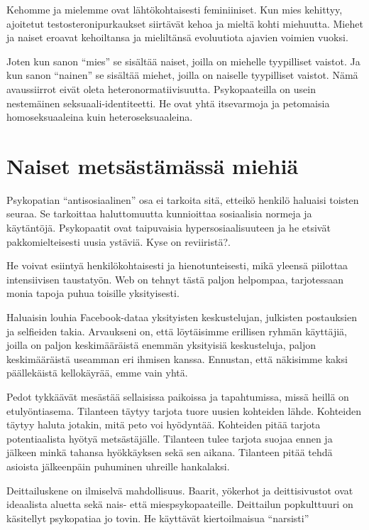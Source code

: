 Kehomme ja mielemme ovat lähtökohtaisesti feminiiniset. Kun mies kehittyy, ajoitetut testosteronipurkaukset siirtävät kehoa ja mieltä kohti miehuutta. Miehet ja naiset eroavat kehoiltansa ja mieliltänsä evoluutiota ajavien voimien vuoksi.

Joten kun sanon ``mies\vmq{,}'' se sisältää naiset, joilla on miehelle tyypilliset vaistot. Ja kun sanon ``nainen\vmq{,}'' se sisältää miehet, joilla on naiselle tyypilliset vaistot. Nämä avaussiirrot eivät oleta heteronormatiivisuutta. Psykopaateilla on usein nestemäinen seksuaali-identiteetti. He ovat yhtä itsevarmoja ja petomaisia homoseksuaaleina kuin heteroseksuaaleina.

\section{Naiset metsästämässä miehiä}

Psykopatian ``antisosiaalinen'' osa ei tarkoita sitä, etteikö henkilö haluaisi toisten seuraa. Se tarkoittaa haluttomuutta kunnioittaa sosiaalisia normeja ja käytäntöjä. Psykopaatit ovat taipuvaisia hypersosiaalisuuteen ja he etsivät pakkomielteisesti uusia ystäviä. Kyse on reviiristä?.

He voivat esiintyä henkilökohtaisesti ja hienotunteisesti, mikä yleensä piilottaa intensiivisen taustatyön. Web on tehnyt tästä paljon helpompaa, tarjotessaan monia tapoja puhua toisille yksityisesti.

Haluaisin louhia Facebook-dataa yksityisten keskustelujan, julkisten postauksien ja selfieiden takia. Arvaukseni on, että löytäisimme erillisen ryhmän käyttäjiä, joilla on paljon keskimääräistä enemmän yksityisiä keskusteluja, paljon keskimääräistä useamman eri ihmisen kanssa. Ennustan, että näkisimme kaksi päällekäistä kellokäyrää, emme vain yhtä.

Pedot tykkäävät mesästää sellaisissa paikoissa ja tapahtumissa, missä heillä on etulyöntiasema. Tilanteen täytyy tarjota tuore uusien kohteiden lähde. Kohteiden täytyy haluta jotakin, mitä peto voi hyödyntää. Kohteiden pitää tarjota potentiaalista hyötyä metsästäjälle. Tilanteen tulee tarjota suojaa ennen ja jälkeen minkä tahansa hyökkäyksen sekä sen aikana. Tilanteen pitää tehdä asioista jälkeenpäin puhuminen uhreille hankalaksi.

Deittailuskene on ilmiselvä mahdollisuus. Baarit, yökerhot ja deittisivustot ovat ideaalista aluetta sekä nais- että miespsykopaateille. Deittailun popkulttuuri on käsitellyt psykopatiaa jo tovin. He käyttävät kiertoilmaisua ``narsisti''

